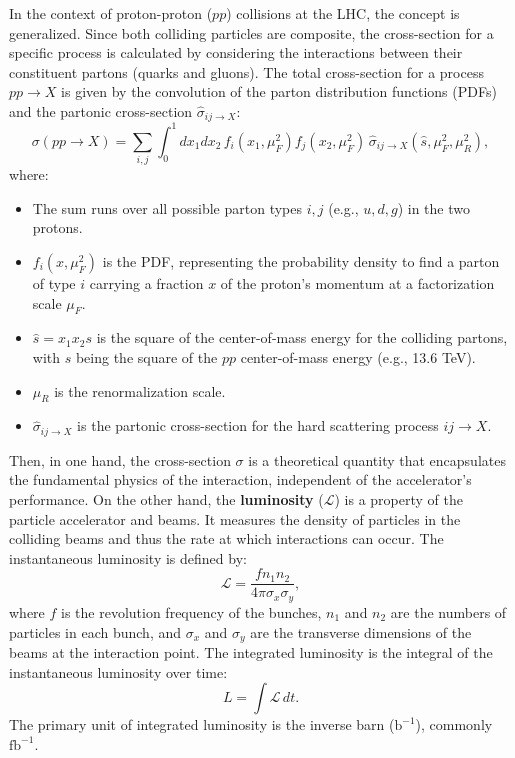 In the context of proton-proton ($pp$) collisions at the LHC, the concept is generalized. Since both colliding particles are composite, the cross-section for a specific process is calculated by considering the interactions between their constituent partons (quarks and gluons). The total cross-section for a process $pp \to X$ is given by the convolution of the parton distribution functions (PDFs) and the partonic cross-section $\hat{\sigma}_{ij \to X}$:
\begin{equation}
\sigma(pp \to X) = \sum_{i,j} \int_0^1 dx_1 dx_2\, f_i(x_1, \mu_F^2) f_j(x_2, \mu_F^2)\, \hat{\sigma}_{ij \to X}(\hat{s}, \mu_F^2, \mu_R^2),
\label{eq:cross_section}
\end{equation}
where:
\begin{itemize}
    \item The sum runs over all possible parton types $i, j$ (e.g., $u, d, g$) in the two protons.
    \item $f_i(x, \mu_F^2)$ is the PDF, representing the probability density to find a parton of type $i$ carrying a fraction $x$ of the proton's momentum at a factorization scale $\mu_F$.
		\item $\hat{s} = x_1 x_2 s$ is the square of the center-of-mass energy for the colliding partons, with $s$ being the square of the $pp$ center-of-mass energy (e.g., 13.6 TeV).
    \item $\mu_R$ is the renormalization scale.
    \item $\hat{\sigma}_{ij \to X}$ is the partonic cross-section for the hard scattering process $ij \to X$.
\end{itemize}
Then, in one hand, the cross-section $\sigma$ is a theoretical quantity that encapsulates the fundamental physics of the interaction, independent of the accelerator's performance. On the other hand, the \textbf{luminosity} ($\mathcal{L}$) is a property of the particle accelerator and beams. It measures the density of particles in the colliding beams and thus the rate at which interactions can occur. The instantaneous luminosity is defined by:
\begin{equation}
\mathcal{L} = \frac{f n_1 n_2}{4\pi \sigma_x \sigma_y},
\end{equation}
where $f$ is the revolution frequency of the bunches, $n_1$ and $n_2$ are the numbers of particles in each bunch, and $\sigma_x$ and $\sigma_y$ are the transverse dimensions of the beams at the interaction point. The integrated luminosity is the integral of the instantaneous luminosity over time:
\begin{equation}
L = \int \mathcal{L}\, dt.
\end{equation}
The primary unit of integrated luminosity is the inverse barn ($\text{b}^{-1}$), commonly $\text{fb}^{-1}$.

